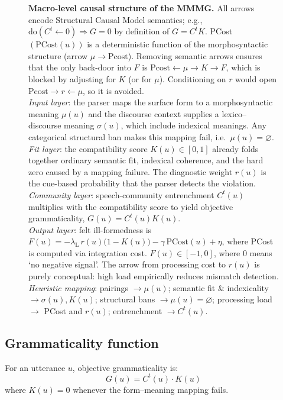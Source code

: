 \documentclass[12pt]{article}
\begin{document}
\begin{figure}[htbp]
\begin{tikzpicture}[
  node distance = 1cm and 2.0cm,
  > = latex,
  var/.style = {rectangle, draw, rounded corners, align=center,
                inner sep=4pt, font=\small}
]
\end{tikzpicture}
\caption[Macro-level causal structure]%
{\textbf{Macro-level causal structure of the MMMG.} All arrows encode Structural Causal Model semantics; e.g., $\text{do}(C^{t} \leftarrow 0) \Rightarrow G = 0$ by definition of $G = C^{t}K$. 
PCost $(\text{PCost}(u))$ is a deterministic function of the morphosyntactic structure (arrow $\mu\!\to\!\text{Pcost}$). Removing semantic arrows ensures that the only back-door into $F$ is $\text{Pcost}\!\leftarrow\!\mu\!\to\!K\!\to\!F$, which is blocked by adjusting for $K$ (or for $\mu$). Conditioning on $r$ would open $\text{Pcost}\!\to\!r\!\leftarrow\!\mu$, so it is avoided.
\\\emph{Input layer}: the parser maps the surface form to a morphosyntactic meaning $\mu(u)$
and the discourse context supplies a lexico–discourse meaning $\sigma(u)$, which include indexical meanings.
Any categorical structural ban makes this mapping fail, i.e.\ $\mu(u)=\varnothing$.
\\\emph{Fit layer}: the compatibility score $K(u)\!\in[0,1]$ already folds together ordinary
semantic fit, indexical coherence, and the hard zero caused by a mapping failure.
The diagnostic weight $r(u)$ is the cue-based probability that the parser detects the
violation. 
\\\emph{Community layer}: speech-community entrenchment $C^{t}(u)$ multiplies with the
compatibility score to yield objective grammaticality,
$G(u)=C^{t}(u)K(u)$.
\\\emph{Output layer}: felt ill-formedness is
$F(u)= -\lambda_{\mathrm L}\,r(u)\!\bigl(1-K(u)\bigr)
       -\gamma\,\text{PCost}(u)+\eta$,
where PCost is computed via integration cost. $F(u)\!\in[-1,0]$, where 0 means `no negative signal'. The arrow from processing cost to $r(u)$ is purely conceptual: high load empirically reduces mismatch detection.
\\\emph{Heuristic mapping}: pairings $\to\mu(u)$;
semantic fit \& indexicality $\to\sigma(u),K(u)$;
structural bans $\to\mu(u)=\varnothing$;
processing load $\to$ PCost and $r(u)$;
entrenchment $\to C^{t}(u)$.}
\label{fig:causal-dag}
\end{figure}

\subsection{Grammaticality function}

For an utterance $u$, objective grammaticality is:
\begin{equation}\label{eq:G}
G(u)=C^{t}(u)\cdot K(u)
\end{equation}
where $K(u) = 0$ whenever the form–meaning mapping fails.
\end{document}
